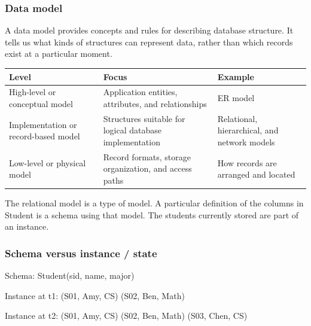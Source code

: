 \subsubsection{Data model}\label{01_database_fundamentals_en-data-model}

A data model provides concepts and rules for describing database structure. It tells us what kinds of structures can represent data, rather than which records exist at a particular moment.

\begin{longtable}[]{@{}
  >{\raggedright\arraybackslash}p{}
  >{\raggedright\arraybackslash}p{}
  >{\raggedright\arraybackslash}p{}@{}}
\toprule\noalign{}
\begin{minipage}[b]{\linewidth}\raggedright
Level
\end{minipage} & \begin{minipage}[b]{\linewidth}\raggedright
Focus
\end{minipage} & \begin{minipage}[b]{\linewidth}\raggedright
Example
\end{minipage} \\
\midrule\noalign{}
\endhead
\bottomrule\noalign{}
\endlastfoot
High-level or conceptual model & Application entities, attributes, and relationships & ER model \\
Implementation or record-based model & Structures suitable for logical database implementation & Relational, hierarchical, and network models \\
Low-level or physical model & Record formats, storage organization, and access paths & How records are arranged and located \\
\end{longtable}

The relational model is a type of model. A particular definition of the columns in Student is a schema using that model. The students currently stored are part of an instance.

\subsubsection{Schema versus instance / state}\label{01_database_fundamentals_en-schema-versus-instance-state}

\begin{StudyCode}
Schema: Student(sid, name, major)

Instance at t1:
(S01, Amy, CS)
(S02, Ben, Math)

Instance at t2:
(S01, Amy, CS)
(S02, Ben, Math)
(S03, Chen, CS)
\end{StudyCode}

